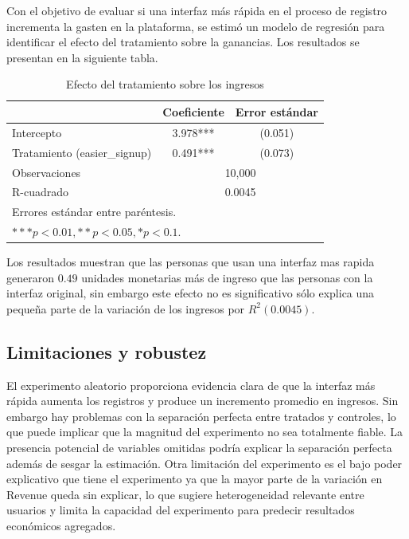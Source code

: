 \documentclass[conference]{IEEEtran}
\begin{document}
Con el objetivo de evaluar si una interfaz más rápida en el proceso de registro incrementa la gasten en la plataforma, se estimó un modelo de regresión para identificar el efecto del tratamiento sobre la ganancias. Los resultados se presentan en la siguiente tabla.

\begin{table}[H]
\centering
\caption{Efecto del tratamiento sobre los ingresos}
\begin{tabular}{lcc}
\toprule
 & \textbf{Coeficiente} & \textbf{Error estándar} \\ 
\midrule
Intercepto & 3.978*** & (0.051) \\
Tratamiento (easier\_signup) & 0.491*** & (0.073) \\
\midrule
Observaciones & \multicolumn{2}{c}{10,000} \\
R-cuadrado & \multicolumn{2}{c}{0.0045} \\
\bottomrule
\multicolumn{3}{l}{Errores estándar entre paréntesis.} \\
\multicolumn{3}{l}{$*** p < 0.01, ** p < 0.05, * p < 0.1$.} \\
\end{tabular}
\end{table}

Los resultados muestran que las personas que usan una interfaz mas rapida generaron $0.49$ unidades monetarias más de ingreso que las personas con la interfaz original, sin embargo este efecto no es significativo sólo explica una pequeña parte de la variación de los ingresos por $R^2 (0.0045)$. 



\subsection{Limitaciones y robustez}

El experimento aleatorio proporciona evidencia clara de que la interfaz más rápida aumenta los registros y produce un incremento promedio en ingresos. Sin embargo hay problemas con la separación perfecta entre tratados y controles, lo que puede implicar que la magnitud del experimento no sea totalmente fiable. La presencia potencial de variables omitidas podría explicar la separación perfecta además de sesgar la estimación. Otra limitación del experimento es el bajo poder explicativo que tiene el experimento ya que la mayor parte de la variación en Revenue queda sin explicar, lo que sugiere heterogeneidad relevante entre usuarios y limita la capacidad del experimento para predecir resultados económicos agregados.
\end{document}
